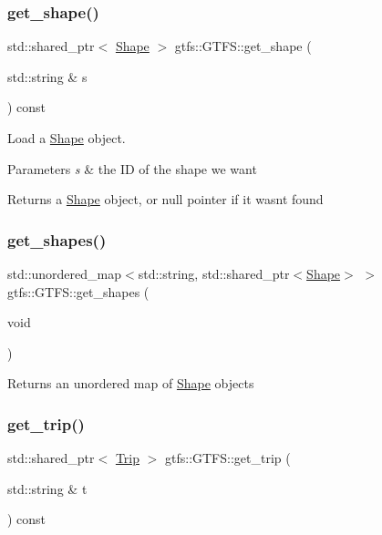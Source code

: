 \subsubsection{\texorpdfstring{get\+\_\+shape()}{get\_shape()}}
{\footnotesize\ttfamily std\+::shared\+\_\+ptr$<$ \hyperlink{classgtfs_1_1Shape}{Shape} $>$ gtfs\+::\+G\+T\+F\+S\+::get\+\_\+shape (\begin{DoxyParamCaption}\item[{std\+::string \&}]{s }\end{DoxyParamCaption}) const}

Load a \hyperlink{classgtfs_1_1Shape}{Shape} object. 
\begin{DoxyParams}{Parameters}
{\em s} & the ID of the shape we want \\
\hline
\end{DoxyParams}
\begin{DoxyReturn}{Returns}
a \hyperlink{classgtfs_1_1Shape}{Shape} object, or null pointer if it wasn\textquotesingle{}t found 
\end{DoxyReturn}
\mbox{\label{classgtfs_1_1GTFS_a91ada6a3f02e3ee9b6a723a6c6fc50af}} 
\subsubsection{\texorpdfstring{get\+\_\+shapes()}{get\_shapes()}}
{\footnotesize\ttfamily std\+::unordered\+\_\+map$<$std\+::string, std\+::shared\+\_\+ptr$<$\hyperlink{classgtfs_1_1Shape}{Shape}$>$ $>$ gtfs\+::\+G\+T\+F\+S\+::get\+\_\+shapes (\begin{DoxyParamCaption}\item[{void}]{ }\end{DoxyParamCaption})\hspace{0.3cm}{\ttfamily [inline]}}

\begin{DoxyReturn}{Returns}
an unordered map of \hyperlink{classgtfs_1_1Shape}{Shape} objects 
\end{DoxyReturn}
\mbox{\label{classgtfs_1_1GTFS_aec86fae3dee1e13f541798266fb2317e}} 
\subsubsection{\texorpdfstring{get\+\_\+trip()}{get\_trip()}}
{\footnotesize\ttfamily std\+::shared\+\_\+ptr$<$ \hyperlink{classgtfs_1_1Trip}{Trip} $>$ gtfs\+::\+G\+T\+F\+S\+::get\+\_\+trip (\begin{DoxyParamCaption}\item[{std\+::string \&}]{t }\end{DoxyParamCaption}) const}

